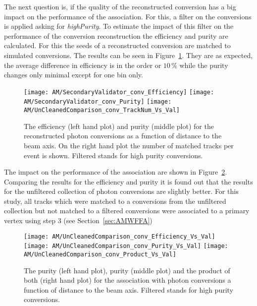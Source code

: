 The next question is, if the quality of the reconstructed conversion has a big impact on the performance of the association. For this, a filter on the conversions is applied asking for \textit{highPurity}. To estimate the impact of this filter on the performance of the conversion reconstruction the efficiency and purity are calculated. For this the seeds of a reconstructed conversion are matched to simulated conversions. The results can be seen in Figure~\ref{plot:AMWFSVpcEffAndPurDC}. They are as expected, the average difference in efficiency is in the order or $10\,\%$ while the purity changes only minimal except for one bin only.

\begin{figure}[!ht]
  \centering
  \texttt{[image: AM/SecondaryValidator\_conv\_Efficiency]}
  \texttt{[image: AM/SecondaryValidator\_conv\_Purity]}
  \texttt{[image: AM/UnCleanedComparison\_conv\_TrackNum\_Vs\_Val]}
  \caption[Purity and efficiency of the reconstructed photon conversions as a function of distance to the beam axis and number of matched tracks]{The efficiency (left hand plot) and purity (middle plot) for the reconstructed photon conversions as a function of distance to the beam axis. On the right hand plot the number of matched tracks per event is shown. Filtered stands for high purity conversions. \label{plot:AMWFSVpcEffAndPurDC}}
\end{figure}

The impact on the performance of the association are shown in Figure~\ref{plot:AMWFSVpcEffAndPurRT}. Comparing the results for the efficiency and purity it is found out that the results for the unfiltered collection of photon conversions are slightly better. For this study, all tracks which were matched to a conversions from the unfiltered collection but not matched to a filtered conversions were associated to a primary vertex using step 3 (see Section~\ref{sec:AMWFFA})

\begin{figure}[!ht]
  \centering
  \texttt{[image: AM/UnCleanedComparison\_conv\_Efficiency\_Vs\_Val]}
  \texttt{[image: AM/UnCleanedComparison\_conv\_Purity\_Vs\_Val]}
  \texttt{[image: AM/UnCleanedComparison\_conv\_Product\_Vs\_Val]}
  \caption[Efficiency, purity and their product for the association with photon conversions a function of distance to the beam axis]{The purity (left hand plot), purity (middle plot) and the product of both (right hand plot) for the association with photon conversions a function of distance to the beam axis. Filtered stands for high purity conversions.\label{plot:AMWFSVpcEffAndPurRT}}
\end{figure}

